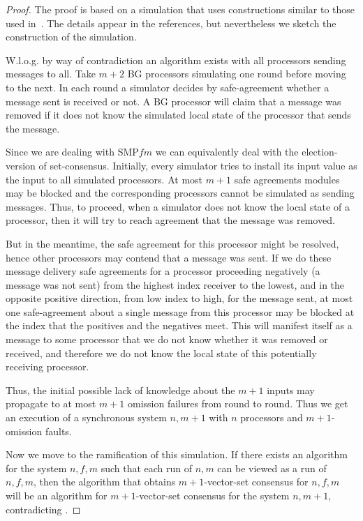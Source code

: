 \documentclass[11pt]{article}
\newcommand{\SMPfm}{\mbox{SMP\!$f\!m$}\xspace}
\begin{document}
\begin{proof}
The proof is based on a simulation that uses  constructions similar to those used in~\cite{GGP05, GGP11}.
The details appear in the references, but nevertheless we sketch the construction of the simulation.

W.l.o.g. by way of contradiction an algorithm exists with all processors sending messages to all. 
Take $m+2$ BG processors \cite{GGP05,GGP11}
 simulating one round before moving to the next. 
In each round a simulator decides by safe-agreement \cite{BG,BGLR} 
whether a message sent is received or not.
A BG processor will  claim that a message was removed if it does not
know the simulated local state of the processor that sends the message.

Since we are dealing with \SMPfm we can equivalently deal with the election-version of set-consensus.
Initially, every simulator tries to install its input value as the input to all
simulated processors. At most $m+1$ safe agreements modules may be blocked and the corresponding 
processors cannot be simulated as sending messages. Thus, to proceed, when a simulator does not
know the local state of a processor, then  it will try to reach agreement 
that the message was removed. 

But in the meantime, the safe agreement for this processor might be resolved, hence other processors
may contend that a message was sent. If we do these message delivery safe agreements for a processor 
proceeding negatively (a message was not sent) from the highest index receiver to the lowest, and
in the opposite positive direction, from low index to high, for the message sent, at most one safe-agreement about a single message
from this processor may be blocked at the index that the positives and the negatives meet.
This will manifest itself as a message to some processor that we do not know whether it was removed
or received, and therefore we do not know the local state of this potentially receiving processor.

Thus, the initial possible lack of knowledge about the $m+1$ inputs may propagate to at most $m+1$ 
omission failures from round to round. Thus we get an execution of a synchronous system $n,m+1$ 
with $n$ processors and $m+1$-omission faults.



Now we move to the ramification of this simulation.  If there exists an algorithm
for the system $n,f,m$ such that each run of $n,m$ can be viewed as a run of $n,f,m$,
then the algorithm that obtains $m+1$-vector-set consensus for $n,f,m$ will be an algorithm for $m+1$-vector-set consensus
for the system $n,m+1$, contradicting \cite{BG,HS,SZ}. 



\end{proof}
\end{document}
